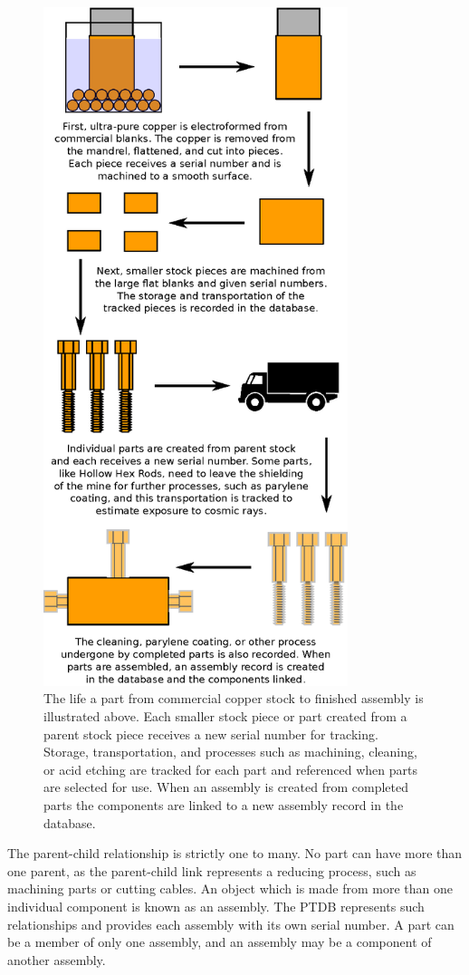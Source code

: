 \documentclass[journal]{IEEEtran}
\begin{document}
\begin{figure}[!t]
\centering
\includegraphics[width=3.5in]{example_part}
\caption{The life a part from commercial copper stock to finished assembly is illustrated above. Each smaller stock piece or part created from a
parent stock piece receives a new serial number for tracking.
Storage, transportation, and processes such as machining, cleaning, or acid etching are tracked for each part and
referenced when parts are selected for use. When an assembly is created from completed parts 
the components are linked to a new assembly record in the database.}
\label{example_part}
\end{figure}


The parent-child relationship is strictly one to many. No part can have more than one parent, as the parent-child link
represents a reducing process, such as machining parts or cutting cables. An object which is made from more than one individual
component is known as an assembly. The PTDB represents such relationships and provides each assembly with its own serial number. A part can be a member of only one assembly,
and an assembly may be a component of another assembly.
\end{document}

